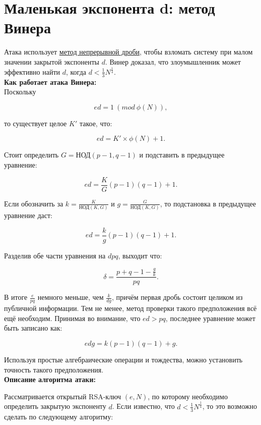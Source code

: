 \documentclass[12pt,a4paper]{scrartcl}
\begin{document}
\section{Маленькая экспонента d: метод Винера}

Атака использует \href{https://yatb.kksctf.ru/}{метод непрерывной дроби}, чтобы взломать систему при малом значении закрытой экспоненты $d$. Винер доказал, что злоумышленник может эффективно найти $d$, когда $d<{\frac {1}{3}}N^{\frac {1}{4}}$.\\

\textbf{Как работает атака Винера:}\\

Поскольку

$$ed=1\ (mod\ \phi(N)),$$

то существует целое $K'$ такое, что:

$$ed=K'\times \phi(N)+1.$$

Стоит определить $G=\text{НОД}(p-1,q-1)$ и подставить в предыдущее уравнение:

$$ed={\frac {K}{G}}(p-1)(q-1)+1.$$

Если обозначить за $k={\frac {K}{\text{НОД}(K,G)}}$ и $g={\frac {G}{\text{НОД}(K,G)}}$, то подстановка в предыдущее уравнение даст:

$$ed={\frac {k}{g}}(p-1)(q-1)+1.$$

Разделив обе части уравнения на $dpq$, выходит что:

$$\delta ={\frac {p+q-1-{\frac {g}{k}}}{pq}}.$$

В итоге ${\frac {e}{pq}}$ немного меньше, чем ${\frac {k}{dg}}$, причём первая дробь состоит целиком из публичной информации. Тем не менее, метод проверки такого предположения всё ещё необходим. Принимая во внимание, что $ed>pq$, последнее уравнение может быть записано как:

$$edg=k(p-1)(q-1)+g.$$

Используя простые алгебраические операции и тождества, можно установить точность такого предположения.\\

\textbf{Описание алгоритма атаки:}

Рассматривается открытый RSA-ключ $(e,N)$, по которому необходимо определить закрытую экспоненту $d$. Если известно, что $d<{\frac {1}{3}}N^{\frac {1}{4}}$, то это возможно сделать по следующему алгоритму:
\end{document}
